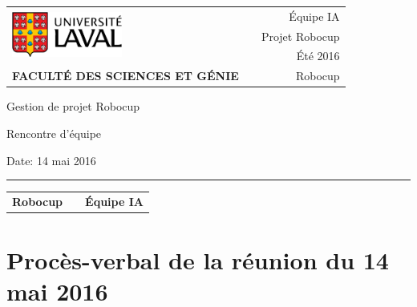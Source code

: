 \documentclass[12pt,letterpaper,twoside]{article}
\begin{document}
\setcounter{secnumdepth}{0}
\begin{titlepage}

        \vspace*{1cm}
        \begin{small}
        \begin{tabularx}{\textwidth}{ l X r }
        \multirow{3}{*}{\includegraphics[height=1.5cm,keepaspectratio]{ul_logo.pdf}}
        && \'Equipe IA\\
        && Projet Robocup\\
        && Été 2016\\

        \scriptsize{\textbf{FACULTÉ DES SCIENCES ET GÉNIE}} && Robocup
        \end{tabularx}
        \end{small}

        \vfill

        \begin{center}

        Gestion de projet Robocup

        \vspace{0.5cm}

        Rencontre d'\'equipe

        \vspace{2cm}

        \end{center}

        \vfill

        Date: 14 mai 2016

        \vspace{0.4cm}

        \rule{\textwidth}{2pt}

        \vspace{0.3cm}

        \begin{tabularx}{\textwidth}{ l X r }

        \textbf{Robocup} && \textbf{\'Equipe IA} \\

        \end{tabularx}


\end{titlepage}


\section*{Proc\`es-verbal de la réunion du 14 mai 2016}
\end{document}
